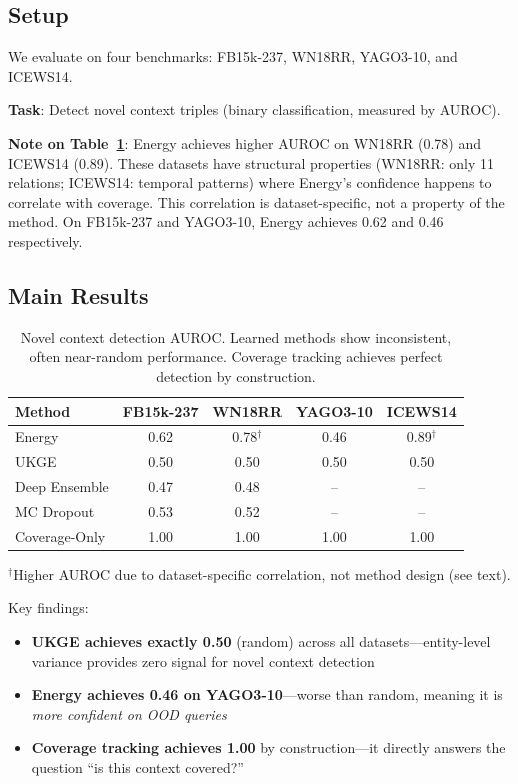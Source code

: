 \documentclass{article}
\begin{document}
\subsection{Setup}

We evaluate on four benchmarks: FB15k-237, WN18RR, YAGO3-10, and ICEWS14.

\textbf{Task}: Detect novel context triples (binary classification, measured by AUROC).

\textbf{Note on Table~\ref{tab:main}}: Energy achieves higher AUROC on WN18RR (0.78) and ICEWS14 (0.89). These datasets have structural properties (WN18RR: only 11 relations; ICEWS14: temporal patterns) where Energy's confidence happens to correlate with coverage. This correlation is dataset-specific, not a property of the method. On FB15k-237 and YAGO3-10, Energy achieves 0.62 and 0.46 respectively.

\subsection{Main Results}

\begin{table}[h]
\centering
\caption{Novel context detection AUROC. Learned methods show inconsistent, often near-random performance. Coverage tracking achieves perfect detection by construction.}
\label{tab:main}
\begin{tabular}{lcccc}
\toprule
Method & FB15k-237 & WN18RR & YAGO3-10 & ICEWS14 \\
\midrule
Energy & 0.62 & 0.78$^\dagger$ & 0.46 & 0.89$^\dagger$ \\
UKGE & 0.50 & 0.50 & 0.50 & 0.50 \\
Deep Ensemble & 0.47 & 0.48 & -- & -- \\
MC Dropout & 0.53 & 0.52 & -- & -- \\
\midrule
Coverage-Only & 1.00 & 1.00 & 1.00 & 1.00 \\
\bottomrule
\end{tabular}
\end{table}

$^\dagger$Higher AUROC due to dataset-specific correlation, not method design (see text).

Key findings:
\begin{itemize}
    \item \textbf{UKGE achieves exactly 0.50} (random) across all datasets---entity-level variance provides zero signal for novel context detection
    \item \textbf{Energy achieves 0.46 on YAGO3-10}---worse than random, meaning it is \emph{more confident on OOD queries}
    \item \textbf{Coverage tracking achieves 1.00} by construction---it directly answers the question ``is this context covered?''
\end{itemize}
\end{document}
